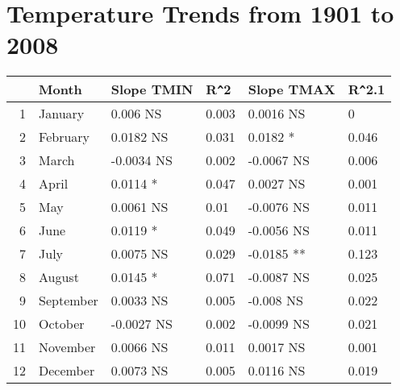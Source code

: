 \documentclass{article}\usepackage[]{graphicx}\usepackage[]{color}
\begin{document}
\section*{Temperature Trends from 1901 to 2008}
\begin{table}[ht]
\centering
\begin{tabular}{rlllll}
  \hline
 & Month & Slope TMIN & R\verb|^|2 & Slope TMAX & R\verb|^|2.1 \\ 
  \hline
1 & January & 0.006 NS & 0.003 & 0.0016 NS & 0 \\ 
  2 & February & 0.0182 NS & 0.031 & 0.0182 * & 0.046 \\ 
  3 & March & -0.0034 NS & 0.002 & -0.0067 NS & 0.006 \\ 
  4 & April & 0.0114 * & 0.047 & 0.0027 NS & 0.001 \\ 
  5 & May & 0.0061 NS & 0.01 & -0.0076 NS & 0.011 \\ 
  6 & June & 0.0119 * & 0.049 & -0.0056 NS & 0.011 \\ 
  7 & July & 0.0075 NS & 0.029 & -0.0185 ** & 0.123 \\ 
  8 & August & 0.0145 * & 0.071 & -0.0087 NS & 0.025 \\ 
  9 & September & 0.0033 NS & 0.005 & -0.008 NS & 0.022 \\ 
  10 & October & -0.0027 NS & 0.002 & -0.0099 NS & 0.021 \\ 
  11 & November & 0.0066 NS & 0.011 & 0.0017 NS & 0.001 \\ 
  12 & December & 0.0073 NS & 0.005 & 0.0116 NS & 0.019 \\ 
   \hline
\end{tabular}
\end{table}
\end{document}
